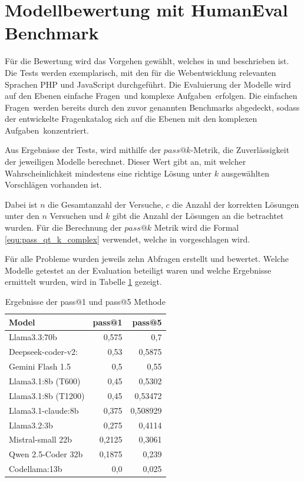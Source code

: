 \section{Modellbewertung mit HumanEval Benchmark}
Für die Bewertung wird das Vorgehen gewählt, welches in \cite{chen-2021} und \cite{peng-2024} beschrieben ist. Die Tests werden exemplarisch, mit den für die Webentwicklung relevanten Sprachen PHP und JavaScript durchgeführt. Die Evaluierung der Modelle wird auf den Ebenen \glqq einfache Fragen\grqq \ und \glqq komplexe Aufgaben\grqq \ erfolgen. Die \glqq einfachen Fragen\grqq \ werden bereits durch den zuvor genannten Benchmarks abgedeckt, sodass der entwickelte Fragenkatalog sich auf die Ebenen mit den \glqq komplexen Aufgaben\grqq \ konzentriert.\vspace{0.2cm}

Aus Ergebnisse der Tests, wird mithilfe der $pass@k$-Metrik, die Zuverlässigkeit der jeweiligen Modelle berechnet. Dieser Wert gibt an, mit welcher Wahrscheinlichkeit mindestens eine richtige Lösung unter $k$ ausgewählten Vorschlägen vorhanden ist.\vspace{0.2cm}

Dabei ist $n$ die Gesamtanzahl der Versuche, $c$ die Anzahl der korrekten Lösungen unter den $n$ Versuchen und $k$ gibt die Anzahl der Lösungen an die betrachtet wurden. Für die Berechnung der $pass@k$ Metrik wird die Formal \ref{equ:pass_qt_k_complex} verwendet, welche in \cite{chen-2021} vorgeschlagen wird.\vspace{0.2cm}

Für alle Probleme wurden jeweils zehn Abfragen erstellt und bewertet. Welche Modelle getestet an der Evaluation beteiligt waren und welche Ergebnisse ermittelt wurden, wird in Tabelle \ref{tab:prompt_results_open_models} gezeigt.

\begin{table}[!ht]
	\begin{tabular}{|l|r|r|}
		\hline
		\textbf{Model} & \textbf{pass@1} & \textbf{pass@5} \\
		\hline
		Llama3.3:70b        &  0,575 &      0,7 \\
		Deepseek-coder-v2:  &   0,53 &   0,5875 \\
		Gemini Flash 1.5    &    0,5 &     0,55 \\
		Llama3.1:8b (T600)  &   0,45 &   0,5302 \\
		Llama3.1:8b (T1200) &   0,45 &  0,53472 \\
		Llama3.1-claude:8b  &  0,375 & 0,508929 \\
		Llama3.2:3b         &  0,275 &   0,4114 \\
		Mistral-small 22b   & 0,2125 &   0,3061 \\
		Qwen 2.5-Coder 32b  & 0,1875 &    0,239 \\
		Codellama:13b       &    0,0 &    0,025 \\
		\hline
		\hline
	\end{tabular}
	\centering
	\label{tab:prompt_results_open_models}
	\caption{Ergebnisse der pass@1 und pass@5 Methode}
\end{table}

